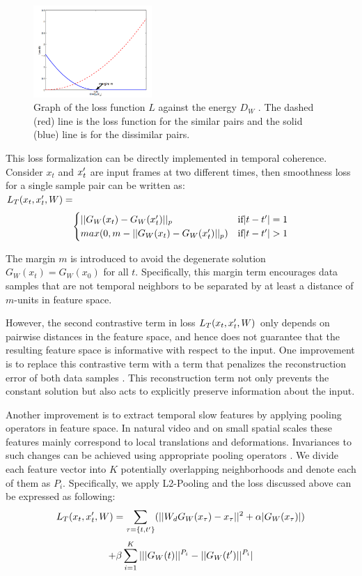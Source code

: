 \begin{figure}
\centering
\hspace{-3mm}
\includegraphics[width=0.4\textwidth]{./Images/twoloss.png}
\caption{Graph of the loss function $L$ against the energy $D_W$ . The dashed (red) line is the loss function for the similar pairs and the solid (blue) line is for the dissimilar pairs.}
\label{fig:twoloss}
\vspace{-4mm}
\end{figure}

This loss formalization can be directly implemented in temporal coherence. Consider $x_t$ and $x_t\rq{}$ are input frames at two different times, then smoothness loss for a single sample pair can be written as:\\
$L_T(x_t, x_t\rq{}, W) = $
\[   
     \begin{cases}
       ||G_W(x_t) - G_W(x_t\rq{})||_p & \text{if} |t-t\rq{}| = 1\\
       max(0, m - ||G_W(x_t) - G_W(x_t\rq{})||_p) &\text{if} |t-t\rq{}| > 1 \\
     \end{cases}
\]

The margin $m$ is introduced to avoid the degenerate solution $G_W(x_t) = G_W(x_0)$ for all $t$. 
Specifically, this margin term encourages data samples that are not temporal neighbors to be separated by at least a distance of $m$-units in feature space. 

However, the second contrastive term in loss $L_T(x_t, x_t\rq{}, W)$ only depends on pairwise distances in the feature space, and hence does not guarantee that the resulting feature space is informative with respect to the input. 
One improvement is to replace this contrastive term with a term that penalizes the reconstruction error of both data samples \cite{LeCun2014coherence}. 
This reconstruction term not only prevents the constant solution but also acts to explicitly preserve information about the input.

Another improvement is to extract temporal slow features by applying pooling operators in feature space. 
In natural video and on small spatial scales these features mainly correspond to local translations and deformations. 
Invariances to such changes can be achieved using appropriate pooling operators \cite{Mallat2013scattering}.
We divide each feature vector into $K$ potentially overlapping neighborhoods and denote each of them as $P_i$. 
Specifically, we apply L2-Pooling and the loss discussed above can be expressed as following:
$$L_T(x_t, x_t\rq{}, W) = \sum_{\tau = \{t, t\rq{}\}} (||W_d G_W(x_\tau) - x_\tau||^2 + \alpha |G_W(x_\tau)|)$$
$$+ \beta \sum_{i=1}^K |||G_W(t)||^{P_i} -  ||G_W(t\rq{})||^{P_i}|$$